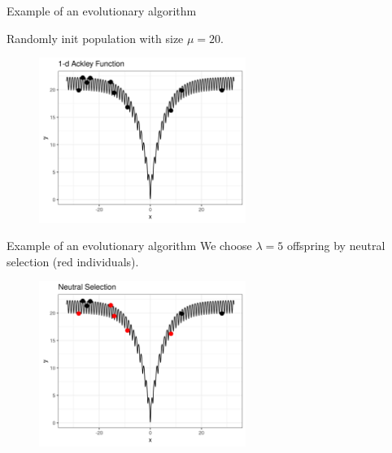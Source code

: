 \documentclass[11pt,compress,t,notes=noshow, xcolor=table]{beamer}
\begin{document}
\begin{vbframe}{Example of an evolutionary algorithm}

Randomly init population with size $\mu = 20$.
\vspace{0.5cm}

\begin{center}
\begin{figure}
  \includegraphics[width=0.6\textwidth]{figure_man/1dim-ackley-func-2.png}
\end{figure}
\end{center}

\end{vbframe}

\begin{vbframe}{Example of an evolutionary algorithm}
We choose $\lambda = 5$ offspring by neutral selection (red individuals).

\vspace{0.5cm}

\begin{center}
\begin{figure}
  \includegraphics[width=0.6\textwidth]{figure_man/1dim-ackley-func-neutral-selec.png}
\end{figure}
\end{center}

\end{vbframe}
\end{document}
